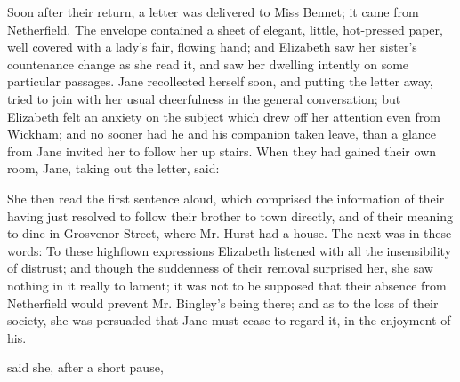 Soon after their return, a letter was delivered to Miss Bennet; it came from Netherfield. The envelope contained a sheet of elegant, little, hot-pressed paper, well covered with a lady's fair, flowing hand; and Elizabeth saw her sister's countenance change as she read it, and saw her dwelling intently on some particular passages. Jane recollected herself soon, and putting the letter away, tried to join with her usual cheerfulness in the general conversation; but Elizabeth felt an anxiety on the subject which drew off her attention even from Wickham; and no sooner had he and his companion taken leave, than a glance from Jane invited her to follow her up stairs. When they had gained their own room, Jane, taking out the letter, said:


She then read the first sentence aloud, which comprised the information of their having just resolved to follow their brother to town directly, and of their meaning to dine in Grosvenor Street, where Mr. Hurst had a house. The next was in these words:  To these highflown expressions Elizabeth listened with all the insensibility of distrust; and though the suddenness of their removal surprised her, she saw nothing in it really to lament; it was not to be supposed that their absence from Netherfield would prevent Mr. Bingley's being there; and as to the loss of their society, she was persuaded that Jane must cease to regard it, in the enjoyment of his.

 said she, after a short pause, 

